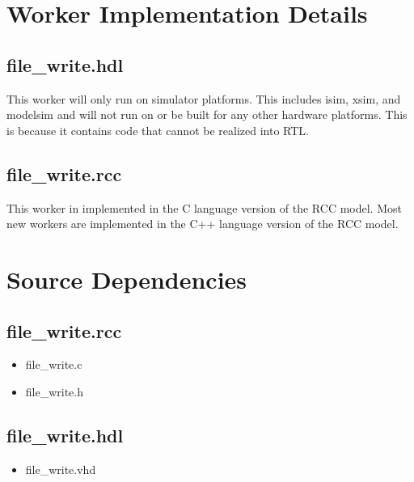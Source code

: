 \documentclass{article}
\def\comp{file\_write}
\begin{document}
\section*{Worker Implementation Details}
\subsection*{\comp.hdl}
\begin{flushleft}
This worker will only run on simulator platforms.  This includes isim, xsim, and modelsim and will not run on or be built for any other hardware platforms.  This is because it contains code that cannot be realized into RTL.
\end{flushleft}
\subsection*{\comp.rcc}
\begin{flushleft}
This worker in implemented in the C language version of the RCC model.  Most new workers are implemented in the C++ language version of the RCC model.
\end{flushleft}
\newpage
\section*{Source Dependencies}
\subsection*{\comp.rcc}
\begin{itemize}
\item file\_write.c
\item file\_write.h
\end{itemize}
\subsection*{\comp.hdl}
\begin{itemize}
\item file\_write.vhd
\end{itemize}
\end{document}
